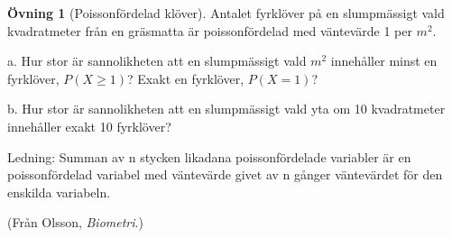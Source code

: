 \documentclass[
]{book}
\theoremstyle{definition}
\theoremstyle{definition}
\theoremstyle{definition}
\newtheorem{exercise}{Övning}[chapter]
\theoremstyle{definition}
\theoremstyle{remark}
\begin{document}
\begin{exercise}[Poissonfördelad klöver]
Antalet fyrklöver på en slumpmässigt vald kvadratmeter från en gräsmatta är poissonfördelad med väntevärde 1 per \(m^2\).

a. Hur stor är sannolikheten att en slumpmässigt vald \(m^2\) innehåller minst en fyrklöver, \(P(X \geq 1)\)? Exakt en fyrklöver, \(P(X = 1)\)?

b. Hur stor är sannolikheten att en slumpmässigt vald yta om 10 kvadratmeter innehåller exakt 10 fyrklöver?

Ledning: Summan av n stycken likadana poissonfördelade variabler är en poissonfördelad variabel med väntevärde givet av n gånger väntevärdet för den enskilda variabeln.

(Från Olsson, \emph{Biometri}.)
\end{exercise}
\end{document}
